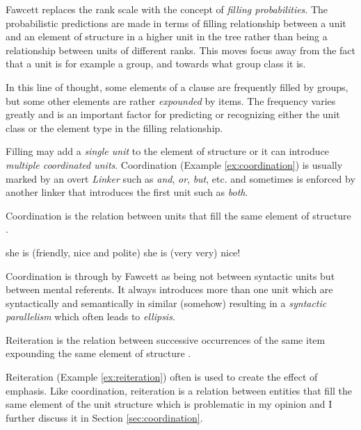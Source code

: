 Fawcett replaces the rank scale with the concept of \textit{filling probabilities}. The probabilistic predictions are made in terms of filling relationship between a unit and an element of structure in a higher unit in the tree rather than being a relationship between units of different ranks. This moves focus away from the fact that a unit is for example a group, and towards what group class it is. 

In this line of thought, some elements of a clause are frequently filled by groups, but some other elements are rather \textit{expounded} by items. The frequency varies greatly and is an important factor for predicting or recognizing either the unit class or the element type in the filling relationship. 

Filling may add a \textit{single unit} to the element of structure or it can introduce \textit{multiple coordinated units}. Coordination (Example \ref{ex:coordination}) is usually marked by an overt \textit{Linker} such as \textit{and}, \textit{or}, \textit{but}, etc. and sometimes is enforced by another linker that introduces the first unit such as \textit{both}.

\begin{definition}[Coordination]\label{def:coordination}
    Coordination is the relation between units that fill the same element of structure \citep[263]{Fawcett2000}. 
\end{definition}

\begin{exe}
    \ex\label{ex:coordination} she is (friendly, nice and polite)
    \ex\label{ex:reiteration} she is (very very) nice!
\end{exe}

Coordination is through by Fawcett as being not between syntactic units but between mental referents. It always introduces more than one unit which are syntactically and semantically in similar (somehow) resulting in a \textit{syntactic parallelism} which often leads to \textit{ellipsis}. 

\begin{definition}[Reiteration]\label{def:reiteration}
    Reiteration is the relation between successive occurrences of the same item expounding the same element of structure  \citep[271]{Fawcett2000}. 
\end{definition}

Reiteration (Example \ref{ex:reiteration}) often is used to create the effect of emphasis. Like coordination, reiteration is a relation between entities that fill the same element of the unit structure which is problematic in my opinion and I further discuss it in Section \ref{sec:coordination}.

